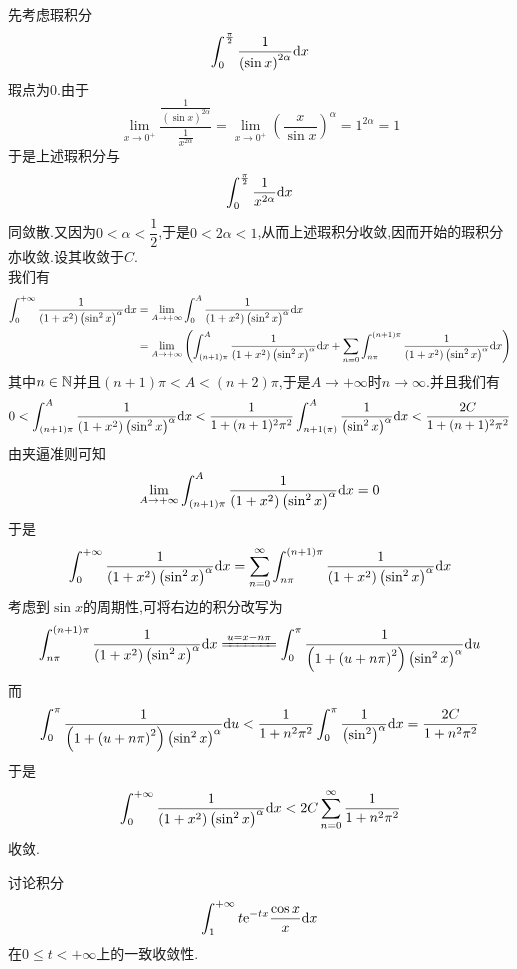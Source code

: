\documentclass{ctexart}
\begin{document}
\begin{solution}
    先考虑瑕积分
    \[\int_0^{\frac\pi2}\dfrac{1}{\left(\sin x\right)^{2\alpha}}\mathrm{d} x\]
    瑕点为$0$.由于
    \[\lim_{x\to0^+}\dfrac{\frac{1}{\left(\sin x\right)^{2\alpha}}}{\frac{1}{x^{2\alpha}}}=\lim_{x\to0^+}\left(\dfrac{x}{\sin x}\right)^{\alpha}=1^{2\alpha}=1\]
    于是上述瑕积分与
    \[\int_0^{\frac\pi2}\dfrac{1}{x^{2\alpha}}\mathrm{d} x\]
    同敛散.又因为$0<\alpha<\dfrac12$,于是$0<2\alpha<1$,从而上述瑕积分收敛,因而开始的瑕积分亦收敛.设其收敛于$C$.\\
    我们有
    \[\begin{aligned}
        \int_0^{+\infty}\dfrac{1}{\left(1+x^2\right)\left(\sin^2 x\right)^\alpha}\mathrm{d} x
        &= \lim_{A\to+\infty}\int_0^A\dfrac{1}{\left(1+x^2\right)\left(\sin^2 x\right)^\alpha}\mathrm{d} x \\
        &= \lim_{A\to+\infty}\left(\int_{(n+1)\pi}^{A}\dfrac{1}{\left(1+x^2\right)\left(\sin^2 x\right)^\alpha}\mathrm{d} x+\sum_{n=0}\int_{n\pi}^{(n+1)\pi}\dfrac{1}{\left(1+x^2\right)\left(\sin^2 x\right)^\alpha}\mathrm{d} x\right)
    \end{aligned}\]
    其中$n\in\mathbb{N}$并且$(n+1)\pi<A<(n+2)\pi$,于是$A\to+\infty$时$n\to\infty$.并且我们有
    \[0<\int_{(n+1)\pi}^A\dfrac{1}{\left(1+x^2\right)\left(\sin^2 x\right)^\alpha}\mathrm{d} x<\dfrac{1}{1+(n+1)^2\pi^2}\int_{n+1(\pi)}^{A}\dfrac{1}{\left(\sin^2 x\right)^\alpha}\mathrm{d} x<\dfrac{2C}{1+(n+1)^2\pi^2}\]
    由夹逼准则可知
    \[\lim_{A\to+\infty}\int_{(n+1)\pi}^A\dfrac{1}{\left(1+x^2\right)\left(\sin^2 x\right)^\alpha}\mathrm{d} x=0\]
    于是
    \[\int_0^{+\infty}\dfrac{1}{\left(1+x^2\right)\left(\sin^2 x\right)^\alpha}\mathrm{d} x
    =\sum_{n=0}^{\infty}\int_{n\pi}^{(n+1)\pi}\dfrac{1}{\left(1+x^2\right)\left(\sin^2 x\right)^\alpha}\mathrm{d} x\]
    考虑到$\sin x$的周期性,可将右边的积分改写为
    \[\int_{n\pi}^{(n+1)\pi}\dfrac{1}{\left(1+x^2\right)\left(\sin^2 x\right)^\alpha}\di x
    \xlongequal{u=x-n\pi}\int_0^{\pi}\dfrac{1}{\left(1+\left(u+n\pi\right)^2\right)\left(\sin^2x\right)^\alpha}\di u\]
    而
    \[\int_0^{\pi}\dfrac{1}{\left(1+\left(u+n\pi\right)^2\right)\left(\sin^2x\right)^\alpha}\mathrm{d} u
    <\dfrac{1}{1+n^2\pi^2}\int_0^{\pi}\dfrac{1}{\left(\sin^2\right)^\alpha}\mathrm{d} x=\dfrac{2C}{1+n^2\pi^2}\]
    于是
    \[\int_0^{+\infty}\dfrac{1}{\left(1+x^2\right)\left(\sin^2 x\right)^\alpha}\mathrm{d} x
    <2C\sum_{n=0}^{\infty}\dfrac{1}{1+n^2\pi^2}\]
    收敛.
\end{solution}
\begin{problem}[6.(12\songti{分})]
    讨论积分
    \[\int_1^{+\infty}t\mathrm{e}^{-tx}\dfrac{\cos x}{x}\mathrm{d} x\]
    在$0\leqslant t<+\infty$上的一致收敛性.
\end{problem}
\end{document}

